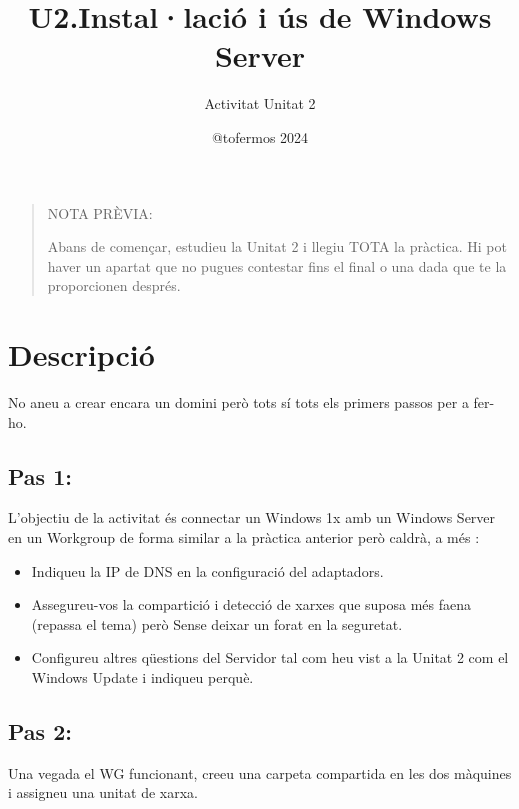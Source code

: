 \documentclass[
  a4paper,
]{article}
\title{U2.Instal·lació i ús de Windows Server}
\subtitle{Activitat Unitat 2}
\author{@tofermos 2024}
\date{}
\providecommand{\tightlist}{%
  \setlength{\itemsep}{0pt}\setlength{\parskip}{0pt}}
\begin{document}
\maketitle

{
\setcounter{tocdepth}{2}
\tableofcontents
}
\newpage
\renewcommand\tablename{Tabla}

\begin{quote}
NOTA PRÈVIA:

Abans de començar, estudieu la Unitat 2 i llegiu TOTA la pràctica. Hi
pot haver un apartat que no pugues contestar fins el final o una dada
que te la proporcionen després.
\end{quote}

\section{Descripció}\label{descripciuxf3}

No aneu a crear encara un domini però tots sí tots els primers passos
per a fer-ho.

\subsection{Pas 1:}\label{pas-1}

L'objectiu de la activitat és connectar un Windows 1x amb un Windows
Server en un Workgroup de forma similar a la pràctica anterior però
caldrà, a més :

\begin{itemize}
\tightlist
\item
  Indiqueu la IP de DNS en la configuració del adaptadors.
\item
  Assegureu-vos la compartició i detecció de xarxes que suposa més faena
  (repassa el tema) però Sense deixar un forat en la seguretat.
\item
  Configureu altres qüestions del Servidor tal com heu vist a la Unitat
  2 com el Windows Update i indiqueu perquè.
\end{itemize}

\subsection{Pas 2:}\label{pas-2}

Una vegada el WG funcionant, creeu una carpeta compartida en les dos
màquines i assigneu una unitat de xarxa.
\end{document}
